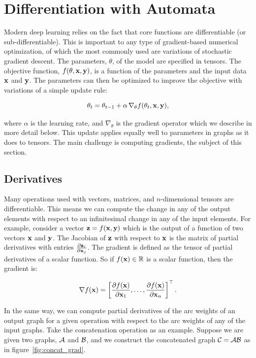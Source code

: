 \section{Differentiation with Automata}
\label{sec:differentiation_with_automata}

Modern deep learning relies on the fact that core functions are differentiable
(or sub-differentiable). This is important to any type of gradient-based
numerical optimization, of which the most commonly used are variations of
stochastic gradient descent. The parameters, $\theta$, of the model are
specified in tensors. The objective function, $f(\theta, {\bf x}, {\bf y})$, is a
function of the parameters and the input data ${\bf x}$ and ${\bf y}$. The parameters
can then be optimized to improve the objective with variations of a simple
update rule:

$$
\theta_t = \theta_{t-1} + \alpha \, \nabla_{\theta} f(\theta_t, {\bf x}, {\bf y}),
$$

where $\alpha$ is the learning rate, and $\nabla_{\theta}$ is the gradient
operator which we describe in more detail below. This update applies equally
well to parameters in graphs as it does to tensors. The main challenge is
computing gradients, the subject of this section.


\subsection{Derivatives}

Many operations used with vectors, matrices, and $n$-dimensional tensors are
differentiable. This means we can compute the change in any of the output
elements with respect to an infinitesimal change in any of the input elements.
For example, consider a vector ${\bf z} = f({\bf x}, {\bf y})$ which is the output of a
function of two vectors ${\bf x}$ and ${\bf y}$. The Jacobian of ${\bf z}$ with respect to
${\bf x}$ is the matrix of partial derivatives with entries $\frac{\partial
{\bf z}_i}{\partial {\bf x}_j}$. The gradient is defined as the tensor of partial
derivatives of a scalar function. So if $f({\bf x}) \in \mathbb{R}$ is a scalar
function, then the gradient is:

$$
\nabla f({\bf x}) = \left[ \frac{\partial f({\bf x})}{\partial {\bf x}_{1}}, \ldots,
    \frac{\partial f({\bf x})}{\partial {\bf x}_{n}}  \right]^\top.
$$

In the same way, we can compute partial derivatives of the arc weights of an
output graph for a given operation with respect to the arc weights of any of
the input graphs. Take the concatenation operation as an example. Suppose we
are given two graphs, $\mathcal{A}$ and $\mathcal{B}$, and we construct the concatenated graph
$\mathcal{C} = \mathcal{A} \mathcal{B}$ as in figure~\ref{fig:concat_grad}.

